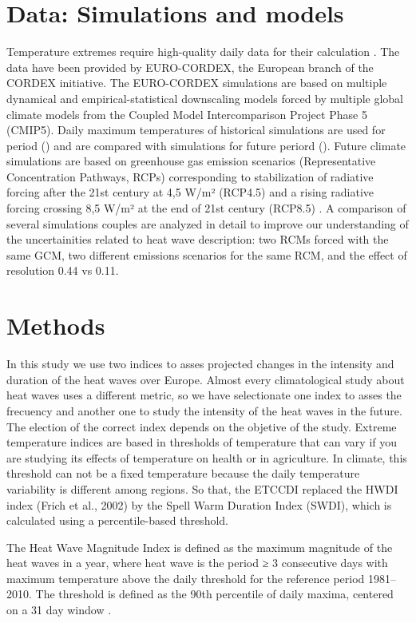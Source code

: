 \section{Data: Simulations and models}

Temperature extremes require high-quality daily data for their calculation \cite{per2015}. The data have been provided by EURO-CORDEX, the European branch of the CORDEX initiative. The EURO-CORDEX simulations are based on multiple dynamical and empirical-statistical downscaling models forced by multiple global climate models from the Coupled Model Intercomparison Project Phase 5 (CMIP5). Daily maximum temperatures of historical simulations are used for period () and are compared with simulations for future periord (). Future climate simulations are based on greenhouse gas emission scenarios (Representative Concentration Pathways, RCPs) corresponding to stabilization of radiative forcing after the 21st century at 4,5 W/m² (RCP4.5) and a rising radiative forcing crossing 8,5 W/m² at the end of 21st century (RCP8.5) \cite{Mos_al2010}. 
A comparison of several simulations couples are analyzed in detail to improve our understanding of the uncertainities related to heat wave description: two RCMs forced with the same GCM, two different emissions scenarios for the same RCM, and the effect of resolution 0.44 vs 0.11. 


\section{Methods}

In this study we use two indices to asses projected changes in the intensity and duration of the heat waves over Europe. Almost every climatological study about heat waves  uses a different metric, so we have selectionate one index to asses the frecuency and another one to study the intensity of the heat waves  in the future. The election of the correct index depends on the objetive of the study. Extreme temperature indices are based in thresholds of temperature that can vary if you are studying its effects of temperature on health or in agriculture.  In climate, this threshold can not be a fixed temperature because the daily temperature variability is different among regions.  So that, the ETCCDI replaced the HWDI index (Frich et al., 2002) by the Spell Warm Duration Index (SWDI), which is calculated using a percentile-based threshold.     

The Heat Wave Magnitude Index is defined as the maximum magnitude of the heat waves in a year, where heat wave is the period ≥ 3 consecutive days with maximum temperature above the daily threshold for the reference period 1981–2010. The threshold is defined as the 90th percentile of daily maxima, centered on a 31 day window \cite{rus_al2014}.

